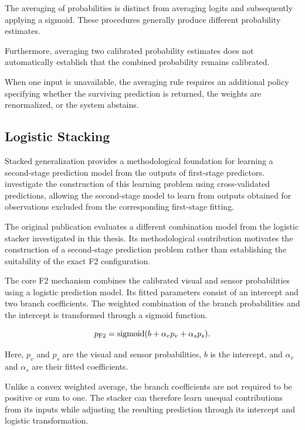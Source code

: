 The averaging of probabilities is distinct from averaging logits and subsequently applying a sigmoid. These procedures generally produce different probability estimates.

Furthermore, averaging two calibrated probability estimates does not automatically establish that the combined probability remains calibrated.

When one input is unavailable, the averaging rule requires an additional policy specifying whether the surviving prediction is returned, the weights are renormalized, or the system abstains.

\subsection{Logistic Stacking}

Stacked generalization provides a methodological foundation for learning a second-stage prediction model from the outputs of first-stage predictors. \textcite{Ting1999Issues} investigate the construction of this learning problem using cross-validated predictions, allowing the second-stage model to learn from outputs obtained for observations excluded from the corresponding first-stage fitting.

The original publication evaluates a different combination model from the logistic stacker investigated in this thesis. Its methodological contribution motivates the construction of a second-stage prediction problem rather than establishing the suitability of the exact F2 configuration.

The core F2 mechanism combines the calibrated visual and sensor probabilities using a logistic prediction model. Its fitted parameters consist of an intercept and two branch coefficients. The weighted combination of the branch probabilities and the intercept is transformed through a sigmoid function.

\begin{equation}
 p_{\mathrm{F2}}=\operatorname{sigmoid}(b+\alpha_v p_v+\alpha_s p_s).
 \label{eq:f2}
\end{equation}

Here, \(p_v\) and \(p_s\) are the visual and sensor probabilities, \(b\) is the intercept, and \(\alpha_v\) and \(\alpha_s\) are their fitted coefficients.

Unlike a convex weighted average, the branch coefficients are not required to be positive or sum to one. The stacker can therefore learn unequal contributions from its inputs while adjusting the resulting prediction through its intercept and logistic transformation.


